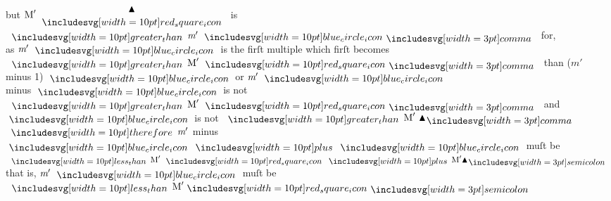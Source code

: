 \documentclass[12pt,preview]{standalone}
\begin{document}
\begin{minipage}{\textwidth}
    \hfill

    \begin{center}
        but $\text{M}'\ \triandsquare$ is $\bgt \textit{m}'\ \bluecircle \bcomma$ for,\\
        as $\textit{m}'\ \bluecircle$ is the firſt multiple which firſt becomes $\bgt \text{M}'\ \redsquare \bcomma$ than ($\textit{m}'$ minus 1) $\bluecircle$ or $\textit{m}'\ \bluecircle$\\
        minus $\bluecircle$ is not $\bgt \text{M}'\ \redsquare \bcomma$ and $\bluecircle$ is not $\bgt \text{M}'\ \blacktriangle \bcomma$\\
        $\btherefore \textit{m}'$ minus $\bluecircle \bplus \bluecircle$ muſt be $\blt \text{M}'\ \redsquare \bplus \text{M}' \blacktriangle \bsemicolon$\\
        that is, $\textit{m}'\ \bluecircle$ muſt be $\blt \text{M}' \redsquare \bsemicolon$\\
    \end{center}
\end{minipage}

\newpage
\end{document}
